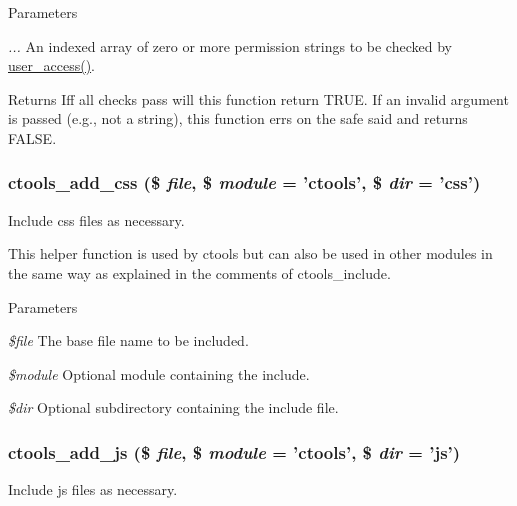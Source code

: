 \begin{DoxyParams}{Parameters}
\item[{\em ...}]An indexed array of zero or more permission strings to be checked by \hyperlink{user_8module_a8daa9d898b1e84225b519ee0c7fb57e0}{user\_\-access()}.\end{DoxyParams}
\begin{DoxyReturn}{Returns}
Iff all checks pass will this function return TRUE. If an invalid argument is passed (e.g., not a string), this function errs on the safe said and returns FALSE. 
\end{DoxyReturn}
\hypertarget{ctools_8module_a7b78eac67e8823a71bee58235355be22}{
\subsubsection[{ctools\_\-add\_\-css}]{\setlength{\rightskip}{0pt plus 5cm}ctools\_\-add\_\-css (\$ {\em file}, \/  \$ {\em module} = {\ttfamily 'ctools'}, \/  \$ {\em dir} = {\ttfamily 'css'})}}
\label{ctools_8module_a7b78eac67e8823a71bee58235355be22}
Include css files as necessary.

This helper function is used by ctools but can also be used in other modules in the same way as explained in the comments of ctools\_\-include.


\begin{DoxyParams}{Parameters}
\item[{\em \$file}]The base file name to be included. \item[{\em \$module}]Optional module containing the include. \item[{\em \$dir}]Optional subdirectory containing the include file. \end{DoxyParams}
\hypertarget{ctools_8module_abfc334b854ec27961cfb3f07382fb370}{
\subsubsection[{ctools\_\-add\_\-js}]{\setlength{\rightskip}{0pt plus 5cm}ctools\_\-add\_\-js (\$ {\em file}, \/  \$ {\em module} = {\ttfamily 'ctools'}, \/  \$ {\em dir} = {\ttfamily 'js'})}}
\label{ctools_8module_abfc334b854ec27961cfb3f07382fb370}
Include js files as necessary.

